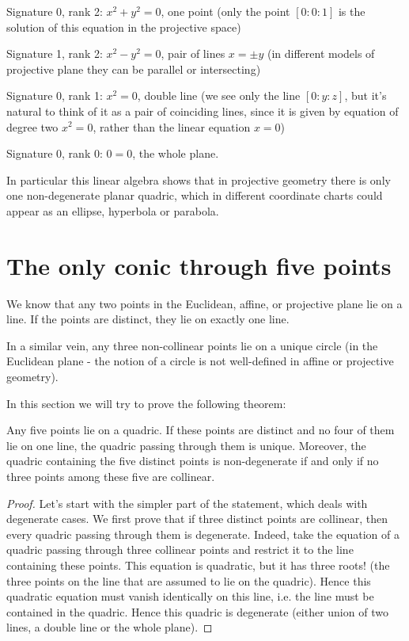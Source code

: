 {{Signature 0, rank 2: $x^2+y^2=0$, one point (only the point $[0:0:1]$ is the solution of this equation in the projective space)

Signature 1, rank 2: $x^2-y^2=0$, pair of lines $x=\pm y$ (in different models of projective plane they can be parallel or intersecting)

Signature 0, rank 1: $x^2=0$, double line (we see only the line $[0:y:z]$, but it's natural to think of it as a pair of coinciding lines, since it is given by equation of degree two $x^2=0$, rather than the linear equation $x=0$)

Signature 0, rank 0: $0=0$, the whole plane.

In particular this linear algebra shows that in projective geometry there is only one non-degenerate planar quadric, which in different coordinate charts could appear as an ellipse, hyperbola or parabola.

\section{The only conic through five points}

We know that any two points in the Euclidean, affine, or projective plane lie on a line. If the points are distinct, they lie on exactly one line.

In a similar vein, any three non-collinear points lie on a unique circle (in the Euclidean plane - the notion of a circle is not well-defined in affine or projective geometry).

In this section we will try to prove the following theorem:

\begin{theorem} Any five points lie on a quadric. If these points are distinct and no four of them lie on one line, the quadric passing through them is unique. Moreover, the quadric containing the five distinct points is non-degenerate if and only if no three points among these five are collinear.
\end{theorem}

\begin{proof}
Let's start with the simpler part of the statement, which deals with degenerate cases. We first prove that if three distinct points are collinear, then every quadric passing through them is degenerate. Indeed, take the equation of a quadric passing through three collinear points and restrict it to the line containing these points. This equation is quadratic, but it has three roots! (the three points on the line that are assumed to lie on the quadric). Hence this quadratic equation must vanish identically on this line, i.e. the line must be contained in the quadric. Hence this quadric is degenerate (either union of two lines, a double line or the whole plane).


\end{proof}}}
